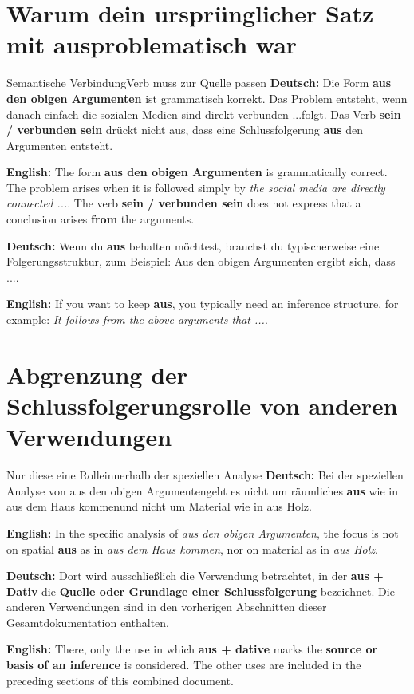 \documentclass[a4paper,11pt]{article}
\newcommand{\GermanText}[1]{\textbf{Deutsch: }#1\par}
\newcommand{\EnglishText}[1]{{\small\color{SoftGray}\textbf{English: }#1\par}}
\begin{document}
\section{Warum dein ursprünglicher Satz mit \glqq aus\grqq problematisch war}

\begin{grammarentry}{Semantische Verbindung}{Verb muss zur Quelle passen}
\GermanText{Die Form \textbf{aus den obigen Argumenten} ist grammatisch korrekt. Das Problem entsteht, wenn danach einfach \glqq die sozialen Medien sind direkt verbunden ...\grqq folgt. Das Verb \textbf{sein / verbunden sein} drückt nicht aus, dass eine Schlussfolgerung \textbf{aus} den Argumenten entsteht.}
\EnglishText{The form \textbf{aus den obigen Argumenten} is grammatically correct. The problem arises when it is followed simply by \textit{the social media are directly connected ...}. The verb \textbf{sein / verbunden sein} does not express that a conclusion arises \textbf{from} the arguments.}

\GermanText{Wenn du \textbf{aus} behalten möchtest, brauchst du typischerweise eine Folgerungsstruktur, zum Beispiel: \glqq Aus den obigen Argumenten ergibt sich, dass ...\grqq.}
\EnglishText{If you want to keep \textbf{aus}, you typically need an inference structure, for example: \textit{It follows from the above arguments that ...}.}
\end{grammarentry}

\section{Abgrenzung der Schlussfolgerungsrolle von anderen Verwendungen}

\begin{grammarentry}{Nur diese eine Rolle}{innerhalb der speziellen Analyse}
\GermanText{Bei der speziellen Analyse von \glqq aus den obigen Argumenten\grqq geht es nicht um räumliches \textbf{aus} wie in \glqq aus dem Haus kommen\grqq und nicht um Material wie in \glqq aus Holz\grqq.}
\EnglishText{In the specific analysis of \textit{aus den obigen Argumenten}, the focus is not on spatial \textbf{aus} as in \textit{aus dem Haus kommen}, nor on material as in \textit{aus Holz}.}

\GermanText{Dort wird ausschließlich die Verwendung betrachtet, in der \textbf{aus + Dativ} die \textbf{Quelle oder Grundlage einer Schlussfolgerung} bezeichnet. Die anderen Verwendungen sind in den vorherigen Abschnitten dieser Gesamtdokumentation enthalten.}
\EnglishText{There, only the use in which \textbf{aus + dative} marks the \textbf{source or basis of an inference} is considered. The other uses are included in the preceding sections of this combined document.}
\end{grammarentry}
\end{document}

